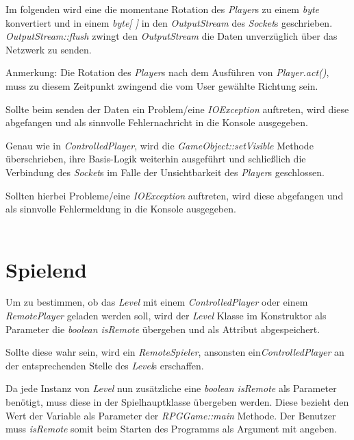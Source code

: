\documentclass{pi1}
\begin{document}
Im folgenden wird eine die momentane Rotation des \textit{Player}s zu einem \textit{byte} konvertiert und in einem \textit{byte[ ]} in den \textit{OutputStream} des \textit{Socket}s geschrieben. \textit{OutputStream::flush} zwingt den \textit{OutputStream} die Daten unverzüglich über das Netzwerk zu senden.

Anmerkung: Die Rotation des \textit{Player}s nach dem Ausführen von \textit{Player.act()}, muss zu diesem Zeitpunkt zwingend die vom User gewählte Richtung sein.

Sollte beim senden der Daten ein Problem/eine \textit{IOException} auftreten, wird diese abgefangen und als sinnvolle Fehlernachricht in die Konsole ausgegeben.


Genau wie in \textit{ControlledPlayer}, wird die \textit{GameObject::setVisible} Methode überschrieben, ihre Basis-Logik weiterhin ausgeführt und schließlich die Verbindung des \textit{Socket}s im Falle der Unsichtbarkeit des  \textit{Player}s geschlossen.

Sollten hierbei Probleme/eine \textit{IOException} auftreten, wird diese abgefangen und als sinnvolle Fehlermeldung in die Konsole ausgegeben.\\\\

\section{Spielend}

Um zu bestimmen, ob das \textit{Level} mit einem \textit{ControlledPlayer} oder einem \textit{RemotePlayer} geladen werden soll, wird der \textit{Level} Klasse im Konstruktor als Parameter die \textit{boolean isRemote} übergeben und als Attribut abgespeichert.


Sollte diese wahr sein, wird ein \textit{RemoteSpieler}, ansonsten ein\textit{ControlledPlayer} an der entsprechenden Stelle des \textit{Level}s erschaffen.


Da jede Instanz von \textit{Level} nun zusätzliche eine \textit{boolean isRemote} als Parameter benötigt, muss diese in der Spielhauptklasse übergeben werden. Diese bezieht den Wert der Variable als Parameter der \textit{RPGGame::main} Methode. Der Benutzer muss \textit{isRemote} somit beim Starten des Programms als Argument mit angeben.
\end{document}
